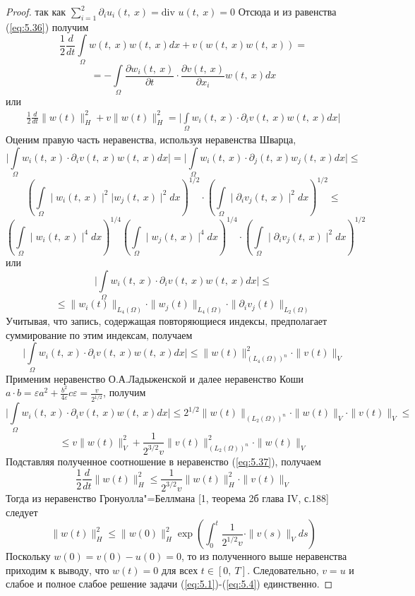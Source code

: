 \begin{proof}
    так как $\sum\limits_{i=1}^{2}\partial_iu_i(t, \ x)= \textrm{div } u(t, \ x)=0$
    Отсюда и из равенства (\ref{eq:5.36}) получим
    $$\frac{1}{2}\frac{d}{dt}\int\limits_\Omega w(t, \ x)w(t, \ x)dx+v(w(t, \ x)w(t, \ x))=$$
    $$=-\int\limits_\Omega\frac{\partial w_i(t, \ x)}{\partial t}\cdot\frac{\partial v(t, \ x)}{\partial x_i}w(t, \ x)dx$$
    или
    \begin{equation}\label{eq:5.37}
        \begin{gathered}
            \frac{1}{2}\frac{d}{dt}\parallel w(t)\parallel_H^2+v\parallel w(t)\parallel_H^2=
            \bigg|\int\limits_\Omega w_i(t, \ x)\cdot\partial_iv(t, \ x)w(t, \ x)dx\bigg|
        \end{gathered}
    \end{equation}
    Оценим правую часть неравенства, используя неравенства Шварца,
    $$\bigg|\int\limits_\Omega w_i(t, \ x)\cdot\partial_iv(t, \ x)w(t, \ x)dx\bigg|=
    \bigg|\int\limits_\Omega w_i(t, \ x)\cdot\partial_j(t, \ x)w_j(t, \ x)dx\bigg|\le$$
    $$\left(\int\limits_\Omega \mid w_i(t, \ x)\mid^2|w_j(t, \ x)\mid^2dx \right)^{1/2}
    \cdot\left(\int\limits_\Omega\mid\partial_iv_j(t, \ x) \mid^2dx \right)^{1/2}\le$$
    $$\left(\int\limits_\Omega \mid w_i(t, \ x)\mid^4dx\right)^{1/4}\left(\int\limits_\Omega \mid w_j(t, \ x)\mid^4dx\right)^{1/4}
    \cdot\left(\int\limits_\Omega\mid\partial_iv_j(t, \ x) \mid^2dx \right)^{1/2}$$
    или
    $$\bigg|\int\limits_\Omega w_i(t, \ x)\cdot\partial_iv(t, \ x)w(t, \ x)dx\bigg|\le$$
    $$\le\parallel w_i(t)\parallel_{L_4(\Omega)}\cdot\parallel w_j(t)\parallel_{L_4(\Omega)}\cdot\parallel\partial_iv_j(t)\parallel_{L_2(\Omega)}$$
    Учитывая, что запись, содержащая повторяющиеся индексы, предполагает суммирование по этим индексам, получаем
    $$\bigg|\int\limits_\Omega w_i(t, \ x)\cdot\partial_iv(t, \ x)w(t, \ x)dx\bigg|\le\parallel w(t)\parallel_{(L_4(\Omega))^n}^2\cdot\parallel v(t)\parallel_V$$
    Применим неравенство О.А.Ладыженской и далее неравенство Коши \linebreak
    $a\cdot b=\varepsilon a^2+\frac{b^2}{4\varepsilon}c\varepsilon=\frac{v}{2^{1/2}}$, получим
    $$\bigg|\int\limits_\Omega w_i(t, \ x)\cdot\partial_iv(t, \ x)w(t, \ x)dx\bigg|\le 2^{1/2}
    \parallel w(t)\parallel_{(L_2(\Omega))^n}\cdot\parallel w(t)\parallel_V\cdot\parallel v(t)\parallel_V\le$$
    $$\le v\parallel w(t)\parallel_V^2+\frac{1}{2^{3/2}v}\parallel v(t)\parallel_{(L_2(\Omega))^n}^2\cdot\parallel w(t)\parallel_V$$
    Подставляя полученное соотношение в неравенство (\ref{eq:5.37}), получаем
    $$\frac{1}{2}\frac{d}{dt}\parallel w(t)\parallel_H^2\le\frac{1}{2^{3/2}v}\parallel w(t)\parallel_H^2\cdot\parallel v(t)\parallel_V$$
    Тогда из неравенство Гронуолла"=Беллмана [1, теорема 2б глава IV, с.188] следует
    $$\parallel w(t)\parallel_H^2\le\parallel w(0)\parallel_H^2\exp\left(\int_0^t\frac{1}{2^{1/2}v}\cdot\parallel v(s)\parallel_Vds\right)$$
    Поскольку $w(0) = v(0)- u(0) = 0$, то из полученного выше неравенства приходим к выводу,
    что $w(t)=0$ для всех $t\in[0, \ T]$. Следовательно, $v=u$ и слабое и полное слабое решение задачи (\ref{eq:5.1})-(\ref{eq:5.4}) единственно.
\end{proof}
